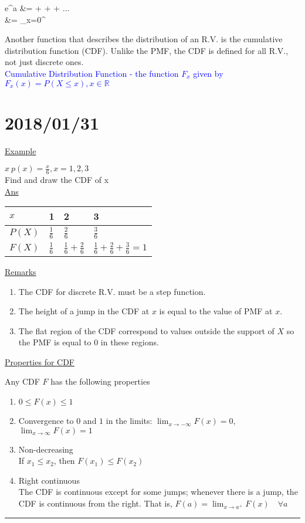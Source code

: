 \documentclass[12pt]{article}
\newcommand{\ddef}[1]{\textcolor{blue}{#1}}
\newcommand{\real}[0]{\mathbb{R}}
\newcommand{\divider}[0]{\par\textcolor{lightgray}{\rule{\textwidth}{0.1pt}}}
\newenvironment{example}{\shownto{-,notes}\underline{Example}\par}{\par\divider\endshownto}
\newenvironment{eqn}{\equation\alignedat{3}}{\endalignedat\endequation}
\begin{document}
\begin{eqn}
	e^a &=  +  +  + ... \\
	&= \sum_{x=0}^\infty {}
\end{eqn}

Another function that describes the distribution of an R.V. is the cumulative distribution function (CDF). Unlike the PMF, the CDF is defined for all R.V., not just discrete ones. \\

\ddef{Cumulative Distribution Function - the function $F_x$ given by $F_x(x) = P(X \le x), x \in \real$}

\section{2018/01/31}

\begin{example}
	$x ~ p(x) = \frac{x}{6}, x = 1, 2, 3$ \\
	Find and draw the CDF of x \\
	
	\underline{Ans} 
	
	\begin{tabular}[t]{@{} l | l | l | l}
		$x$ 	& 1 			& 2 			& 3 \\
		\hline
		$P(X)$	& $\frac{1}{6}$	& $\frac{2}{6}$	& $\frac{3}{6}$ \\
		\hline
		$F(X)$	& $\frac{1}{6}$	& $\frac{1}{6} + \frac{2}{6}$ & $\frac{1}{6} + \frac{2}{6} + \frac{3}{6} = 1$
	\end{tabular}

	\underline{Remarks}
	\begin{enumerate}
		\item The CDF for discrete R.V. must be a step function.
		\item The height of a jump in the CDF at $x$ is equal to the value of PMF at $x$.
		\item The flat region of the CDF correspond to values outside the support of $X$ so the PMF is equal to 0 in these regions.
	\end{enumerate}

	\underline{Properties for CDF}
	
	Any CDF $F$ has the following properties
	
	\begin{enumerate}
		\item $0 \le F(x) \le 1$
		\item Convergence to $0$ and $1$ in the limits:
		$\lim_{x \rightarrow -\infty} F(x) = 0$, $\lim_{x \rightarrow \infty} F(x) = 1$
		\item Non-decreasing \\
		If $x_1 \le x_2$, then $F(x_1) \le F(x_2)$
		\item Right continuous \\
		The CDF is continuous except for some jumps; whenever there is a jump, the CDF is continuous from the right. That is, $F(a) = \lim_{x \rightarrow a^+} F(x) \quad \forall a$
	\end{enumerate}
\end{example}
\end{document}
